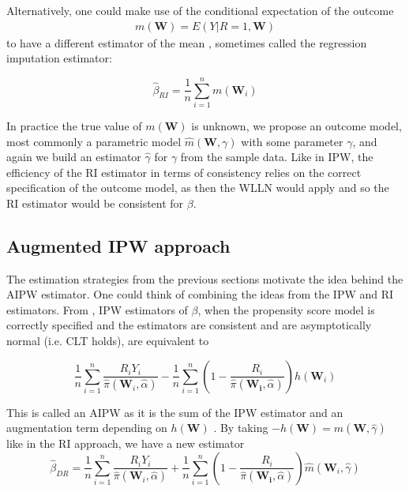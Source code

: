 \documentclass[12pt,twoside]{article}
\begin{document}
Alternatively, one could make use of the conditional expectation of the outcome 
\begin{align*}
    m(\mathbf{W}) = E(Y|R= 1,\mathbf{W})
\end{align*}
to have a different estimator of the mean \citep{davidian,vansteelandt}, sometimes called the regression imputation estimator: 

\begin{equation}
    \hat{\beta}_ {RI} = \frac{1}{n}\sum_{i = 1}^n m(\mathbf{W}_i)
\end{equation}

In practice the true value of $m(\mathbf{W})$ is unknown, we propose an outcome model, most commonly a parametric model $\hat m(\mathbf{W}, \gamma)$ with some parameter $\gamma$, and again we build an estimator $\hat{\gamma}$ for $\gamma$ from the sample data. Like in IPW, the efficiency of the RI estimator in terms of consistency relies on the correct specification of the outcome model, as then the WLLN would apply and so the RI estimator would be consistent for $\beta$. \\

\subsection{Augmented IPW approach} 

The estimation strategies from the previous sections motivate the idea behind the AIPW estimator. One could think of combining the ideas from the IPW and RI estimators. From \citet{davidian}, IPW estimators of $\beta$, when the propensity score model is correctly specified and the estimators are consistent and are asymptotically normal (i.e. CLT holds), are equivalent to 

\begin{equation}
    \frac{1}{n}\sum_{i=1}^{n}\frac{R_iY_i}{\hat\pi(\mathbf{W}_i, \hat{\alpha})} - \frac{1}{n}\sum_{i=1}^{n} \left(1 - \frac{R_i}{\hat\pi(\mathbf{W_i},\hat{\alpha})} \right) h(\mathbf{W}_i)
\end{equation}

This is called an AIPW as it is the sum of the IPW estimator and an augmentation term depending on $h(\mathbf{W})$ \citep{davidian}. By taking $-h(\mathbf{W}) = \hat m(\mathbf{W}, \hat{\gamma})$ like in the RI approach, we have a new estimator
\begin{equation}
    \hat\beta_{DR} = \frac{1}{n}\sum_{i=1}^{n}\frac{R_iY_i}{\hat \pi(\mathbf{W}_i, \hat{\alpha})} + \frac{1}{n}\sum_{i=1}^{n} \left(1 - \frac{R_i}{\hat\pi(\mathbf{W_i},\hat{\alpha})} \right) \hat m(\mathbf{W}_i, \hat\gamma)
\end{equation}
\end{document}
